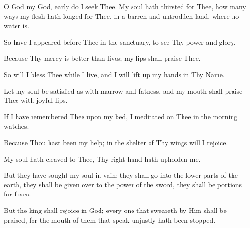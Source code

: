 O God my God, early do I seek Thee. My soul hath thirsted for Thee, how many ways my flesh hath longed for Thee, in a barren and untrodden land, where no water is.

So have I appeared before Thee in the sanctuary, to see Thy power and glory.

Because Thy mercy is better than lives; my lips shall praise Thee.

So will I bless Thee while I live, and I will lift up my hands in Thy Name.

Let my soul be satisfied as with marrow and fatness, and my mouth shall praise Thee with joyful lips.

If I have remembered Thee upon my bed, I meditated on Thee in the morning watches.

Because Thou hast been my help; in the shelter of Thy wings will I rejoice.

My soul hath cleaved to Thee, Thy right hand hath upholden me.

But they have sought my soul in vain; they shall go into the lower parts of the earth, they shall be given over to the power of the
sword, they shall be portions for foxes.

But the king shall rejoice in God; every one that sweareth by Him shall be praised, for the mouth of them that speak unjustly hath been stopped.
